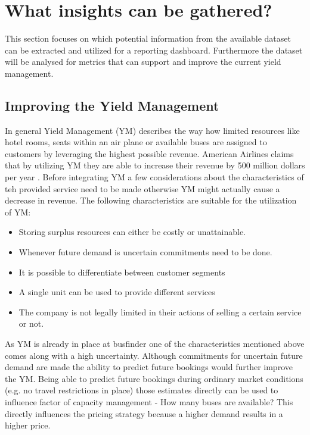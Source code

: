 %
%
% 
% 
% 


\chapter{What insights can be gathered?}
This section focuses on which potential information from the available dataset can be extracted and utilized for a reporting dashboard. Furthermore the dataset will be analysed for metrics that can support and improve the current yield management. 


\section{Improving the Yield Management}
In general Yield Management (YM) describes the way how limited resources like hotel rooms, seats within an air plane or available buses are assigned to customers by leveraging the highest possible revenue. American Airlines claims that by utilizing YM they are able to increase their revenue by 500 million dollars per year \cite{ym_practice}. Before integrating YM a few considerations about the characteristics of teh provided service need to be made otherwise YM might actually cause a decrease in revenue. The following characteristics are suitable for the utilization of YM:\cite{ym_practice}
\begin{itemize}
  \item Storing surplus resources can either be costly or unattainable. 
  \item Whenever future demand is uncertain commitments need to be done.
  \item It is possible to differentiate between customer segments
  \item A single unit can be used to provide different services 
  \item The company is not legally limited in their actions of selling a certain service or not.
\end{itemize}
As YM is already in place at busfinder one of the characteristics mentioned above comes along with a high uncertainty. Although commitments for uncertain future demand are made the ability to predict future bookings would further improve the YM. Being able to predict future bookings during ordinary market conditions (e.g. no travel restrictions in place) those estimates directly can be used to influence factor of capacity management - How many buses are available? This directly influences the pricing strategy because a higher demand results in a higher price.

